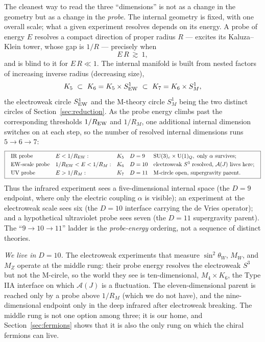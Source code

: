 \documentclass[11pt]{article}
\theoremstyle{plain}
\theoremstyle{definition}
\newcommand{\cA}{\mathcal{A}}
\newcommand{\sinsq}{\sin^{2}\theta_W}
\newcommand{\SU}{\mathrm{SU}}
\newcommand{\U}{\mathrm{U}}
\begin{document}
The cleanest way to read the three ``dimensions'' is not as a change in the
geometry but as a change in the \emph{probe}. The internal geometry is fixed,
with one overall scale; what a given experiment resolves depends on its
energy. A probe of energy $E$ resolves a compact direction of proper radius
$R$ --- excites its Kaluza--Klein tower, whose gap is $1/R$ --- precisely when
\begin{equation}
E\,R\ \gtrsim\ 1,
\label{eq:visibility}
\end{equation}
and is blind to it for $E\,R\ll1$. The internal manifold is built from nested
factors of increasing inverse radius (decreasing size),
\begin{equation}
K_5\ \subset\ K_6=K_5\times S^1_{\rm EW}\ \subset\ K_7=K_6\times S^1_M,
\end{equation}
the electroweak circle $S^1_{\rm EW}$ and the M-theory circle $S^1_M$ being
the two distinct circles of Section~\ref{sec:reduction}. As the probe energy
climbs past the corresponding thresholds $1/R_{\rm EW}$ and $1/R_M$, one
additional internal dimension switches on at each step, so the number of
resolved internal dimensions runs $5\to6\to7$:
\begin{equation}
\boxed{\;
\begin{array}{lllll}
\text{IR probe} & E<1/R_{\rm EW}: & K_5 & D=9 & \SU(3)_c\times\U(1)_Q,\ \text{only }\alpha\ \text{survives};\\[1mm]
\text{EW-scale probe} & 1/R_{\rm EW}<E<1/R_M: & K_6 & D=10 & \text{electroweak }S^3\ \text{resolved, }\cA(J)\ \text{lives here};\\[1mm]
\text{UV probe} & E>1/R_M: & K_7 & D=11 & \text{M-circle open, supergravity parent}.
\end{array}\;}
\end{equation}
Thus the infrared experiment sees a five-dimensional internal space (the
$D=9$ endpoint, where only the electric coupling $\alpha$ is visible); an
experiment at the electroweak scale sees six (the $D=10$ interface carrying
the de Vries operator); and a hypothetical ultraviolet probe sees seven (the
$D=11$ supergravity parent). The ``$9\to10\to11$'' ladder is the
\emph{probe-energy} ordering, not a sequence of distinct theories.

\emph{We live in $D=10$.} The electroweak experiments that measure
$\sinsq$, $M_W$, and $M_Z$ operate at the middle rung: their probe energy
resolves the electroweak $S^3$ but not the M-circle, so the world they see is
ten-dimensional, $M_4\times K_6$, the Type IIA interface on which $\cA(J)$ is
a fluctuation. The eleven-dimensional parent is reached only by a probe above
$1/R_M$ (which we do not have), and the nine-dimensional endpoint only in the
deep infrared after electroweak breaking. The middle rung is not one option
among three; it is our home, and Section~\ref{sec:fermions} shows that it is
also the only rung on which the chiral fermions can live.
\end{document}
